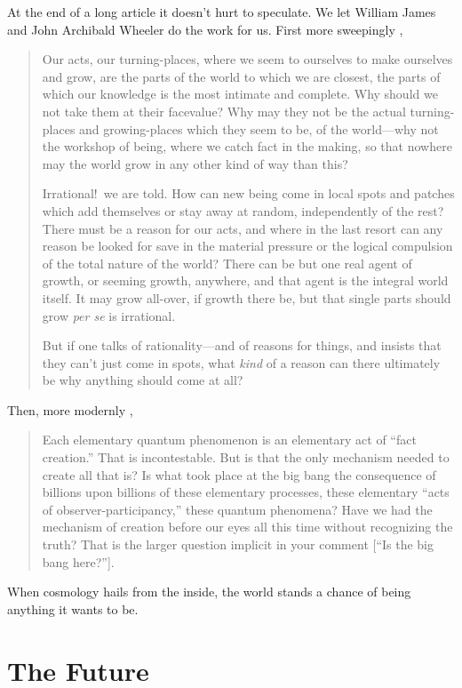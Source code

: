 \documentclass[aps,pra,superscriptaddress,10pt,tightenlines,twocolumn,nofootinbib]{revtex4}
\begin{document}
At the end of a long article it doesn't hurt to speculate.  We let William James and John Archibald Wheeler do the work for us.  First more sweepingly \cite{James22},
\begin{quote}
\noindent Our acts, our turning-places, where we seem to ourselves to
make ourselves and grow, are the parts of the world to which we are
closest, the parts of which our knowledge is the most intimate and
complete. Why should we not take them at their facevalue? Why may
they not be the actual turning-places and growing-places which they
seem to be, of the world---why not the workshop of being, where we
catch fact in the making, so that nowhere may the world grow in any
other kind of way than this?

Irrational!\ we are told. How can new being come in local spots and
patches which add themselves or stay away at random, independently of
the rest? There must be a reason for our acts, and where in the last
resort can any reason be looked for save in the material pressure or
the logical compulsion of the total nature of the world? There can be
but one real agent of growth, or seeming growth, anywhere, and that
agent is the integral world itself. It may grow all-over, if growth
there be, but that single parts should grow {\it per se\/} is
irrational.

But if one talks of rationality---and of reasons for things, and
insists that they can't just come in spots, what {\it kind\/} of a
reason can there ultimately be why anything should come at all?
\end{quote}
Then, more modernly \cite{Wheeler82c},
\begin{quote}
\noindent Each elementary quantum phenomenon is an elementary act of ``fact
creation.'' That is incontestable. But is that the only mechanism
needed to create all that is? Is what took place at the big bang the
consequence of billions upon billions of these elementary processes,
these elementary ``acts of observer-participancy,'' these quantum
phenomena? Have we had the mechanism of creation before our eyes all
this time without recognizing the truth? That is the larger question
implicit in your comment [``Is the big bang here?''].
\end{quote}
When cosmology hails from the inside, the world stands a chance of being anything it wants to be.

\section{The Future}
\end{document}
